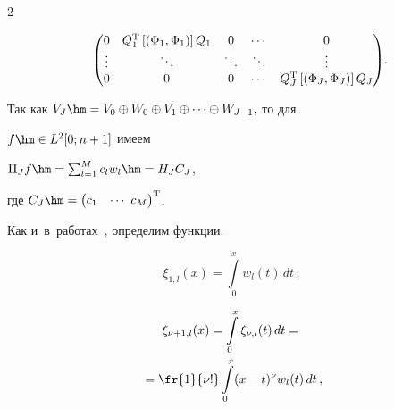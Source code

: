 \begin{multicols}{2}
{\begin{multline*}
\begin{pmatrix}
0 & {Q}_{1}^{\mathrm{T}}\left[( \Phi_{1}, \Phi_{1})\right]{Q}_{1} & 0 & \cdots & 0 \\


\vdots & \ddots & \ddots & \ddots & \vdots \\


0 & 0 & 0 & \cdots & {Q}_{J}^{\mathrm{T}}\left[( \Phi_{J}, \Phi_{J})\right]{Q}_{J}


\end{pmatrix}\!.\hspace*{-12.6139pt}


\end{multline*}


}





\noindent


Так как $V_{J}\hm=V_0\oplus W_0\oplus V_1\oplus\dots\oplus W_{J-1},$ то для 


$f\hm\in {L}^2[0;n+1]$ имеем


$\Pi_{J} f\hm=\sum\nolimits_{l=1}^{M} c_l w_l \hm= {H}_{J}{C}_{J}$,


где ${C}_J\hm=


\begin{pmatrix} c_1 & \cdots\ c_{M} \end{pmatrix}^{\mathrm{T}}$.


Как и~в~работах~\cite{Lepik1, Lepik2, Lepik3, Lepik4, Lepik}, определим функции:


\begin{equation}


\label{U38}


{\xi}_{1,l}(x)=\int\limits_0^x w_l (t)\,dt\,;


\end{equation}










\noindent


\begin{multline}


\label{U38-1}


{\xi}_{\nu+1,l}(x)=\int\limits_0^x {\xi}_{\nu,l}(t)\,dt={}\\


{}=


\fr{1}{\nu !}\int\limits_0^x (x-t)^{\nu} w_l (t)\,dt\,,



\end{multline}
\end{multicols}
